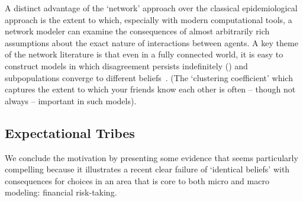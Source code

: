 



    A distinct advantage of the `network' approach over the classical epidemiological approach is the extent to which, especially with modern computational tools, a network modeler can examine the consequences of almost arbitrarily rich assumptions about the exact nature of interactions between agents.  A key theme of the network literature is that even in a fully connected world, it is easy to construct models in which disagreement persists indefinitely (\cite{acemouglu2013opinion}) and subpopulations converge to different beliefs~\cite{sikder2020minimalistic}.  (The `clustering coefficient' which captures the extent to which your friends know each other is often -- though not always -- important in such models).


\subsection{Expectational Tribes}\label{subsec:ExpTribes}

    We conclude the motivation by presenting some evidence that seems particularly compelling because it illustrates a recent clear failure of `identical beliefs' with consequences for choices in an area that is core to both micro and macro modeling: financial risk-taking.

